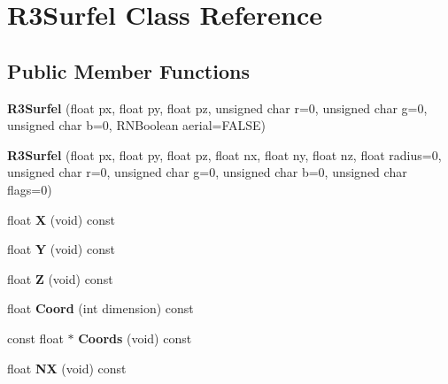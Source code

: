 \hypertarget{class_r3_surfel}{}\section{R3\+Surfel Class Reference}
\label{class_r3_surfel}
\subsection*{Public Member Functions}
\begin{DoxyCompactItemize}
\item 
{\bfseries R3\+Surfel} (float px, float py, float pz, unsigned char r=0, unsigned char g=0, unsigned char b=0, R\+N\+Boolean aerial=F\+A\+L\+SE)\hypertarget{class_r3_surfel_a66b27b2fb91263248e57bd658349c4f0}{}\label{class_r3_surfel_a66b27b2fb91263248e57bd658349c4f0}

\item 
{\bfseries R3\+Surfel} (float px, float py, float pz, float nx, float ny, float nz, float radius=0, unsigned char r=0, unsigned char g=0, unsigned char b=0, unsigned char flags=0)\hypertarget{class_r3_surfel_aa71b74777feac648eb830182f55b834a}{}\label{class_r3_surfel_aa71b74777feac648eb830182f55b834a}

\item 
float {\bfseries X} (void) const \hypertarget{class_r3_surfel_ae812160059c24a38c646ddff8f3aafce}{}\label{class_r3_surfel_ae812160059c24a38c646ddff8f3aafce}

\item 
float {\bfseries Y} (void) const \hypertarget{class_r3_surfel_ad2565bcc563ab663f4519a2026f39b80}{}\label{class_r3_surfel_ad2565bcc563ab663f4519a2026f39b80}

\item 
float {\bfseries Z} (void) const \hypertarget{class_r3_surfel_aa49f3595f5080b3bee482f9d6ed457b4}{}\label{class_r3_surfel_aa49f3595f5080b3bee482f9d6ed457b4}

\item 
float {\bfseries Coord} (int dimension) const \hypertarget{class_r3_surfel_a7e645564ba4d3794dc5cd32e2e692fc2}{}\label{class_r3_surfel_a7e645564ba4d3794dc5cd32e2e692fc2}

\item 
const float $\ast$ {\bfseries Coords} (void) const \hypertarget{class_r3_surfel_a1ae079d2dad433feff504adc601ada30}{}\label{class_r3_surfel_a1ae079d2dad433feff504adc601ada30}

\item 
float {\bfseries NX} (void) const \hypertarget{class_r3_surfel_a7e1e615670828c7b94f2c8c8fc837cb1}{}\label{class_r3_surfel_a7e1e615670828c7b94f2c8c8fc837cb1}


\end{DoxyCompactItemize}
